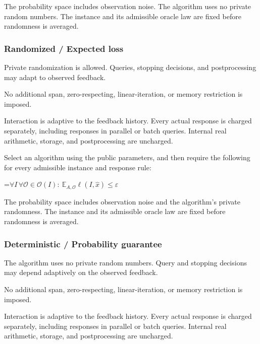 \documentclass[10pt,a4paper]{article}
\newcommand{\AtlasMath}[1]{\par\begingroup\centering\setbox0=\hbox{$\displaystyle #1$}\ifdim\wd0>1.4\linewidth\typeout{ATLAS WIDE FORMULA: \the\wd0}\fi\ifdim\wd0>\linewidth\resizebox{\linewidth}{!}{\box0}\else\box0\fi\par\endgroup}
\begin{document}
The probability space includes observation noise. The algorithm uses no private random numbers. The instance and its admissible oracle law are fixed before randomness is averaged.



\subsubsection{Randomized / Expected loss}


Private randomization is allowed. Queries, stopping decisions, and postprocessing may adapt to observed feedback.



No additional span, zero-respecting, linear-iteration, or memory restriction is imposed.



Interaction is adaptive to the feedback history. Every actual response is charged separately, including responses in parallel or batch queries. Internal real arithmetic, storage, and postprocessing are uncharged.



Select an algorithm using the public parameters, and then require the following for every admissible instance and response rule:




\AtlasMath{\forall I\,\forall\mathcal{O}\in\mathcal{O}(I):\ \mathbb{E}_{A,\mathcal{O}}\ell(I,\widehat{x})\le\varepsilon}




The probability space includes observation noise and the algorithm's private randomness. The instance and its admissible oracle law are fixed before randomness is averaged.



\subsubsection{Deterministic / Probability guarantee}


The algorithm uses no private random numbers. Query and stopping decisions may depend adaptively on the observed feedback.



No additional span, zero-respecting, linear-iteration, or memory restriction is imposed.



Interaction is adaptive to the feedback history. Every actual response is charged separately, including responses in parallel or batch queries. Internal real arithmetic, storage, and postprocessing are uncharged.
\end{document}
